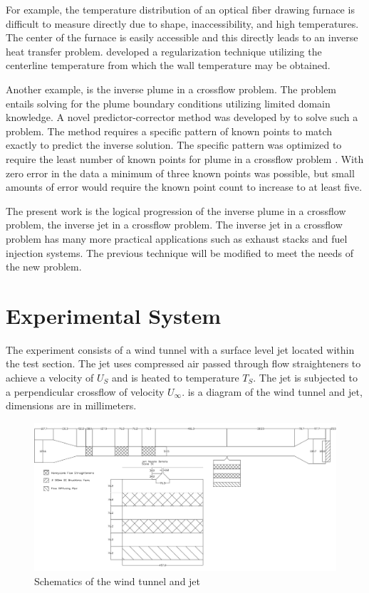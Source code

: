 \documentclass[preprint,12pt]{elsarticle}
\begin{document}
For example, the temperature distribution of an optical fiber drawing furnace is difficult to measure directly due to shape, inaccessibility, and high temperatures.  The center of the furnace is easily accessible and this directly leads to an inverse heat transfer problem.   developed a regularization technique utilizing the centerline temperature from which the wall temperature may be obtained.

Another example, is the inverse plume in a crossflow problem.  The problem entails solving for the plume boundary conditions utilizing limited domain knowledge.  A novel predictor-corrector method was developed by \citet{ijhmt1} to solve such a problem.  The method requires a specific pattern of known points to match exactly to predict the inverse solution.  The specific pattern was optimized to require the least number of known points for plume in a crossflow problem \cite{ijhmt2}.  With zero error in the data a minimum of three known points was possible, but small amounts of error would require the known point count to increase to at least five.

The present work is the logical progression of the inverse plume in a crossflow problem, the inverse jet in a crossflow problem.  The inverse jet in a crossflow problem has many more practical applications such as exhaust stacks and fuel injection systems.  The previous technique will be modified to meet the needs of the new problem.


\section{Experimental System}
The experiment consists of a wind tunnel with a surface level jet located within the test section.  The jet uses compressed air passed through flow straighteners to achieve a velocity of $U_S$ and is heated to temperature $T_S$.  The jet is subjected to a perpendicular crossflow of velocity $U_{\infty}$.   is a diagram of the wind tunnel and jet, dimensions are in millimeters.

\begin{figure}[!tbp]
\begin{center}
\includegraphics[scale=.30]{windtunneljet.jpg}
\caption{Schematics of the wind tunnel and jet}
\label{fig:diagramjet}
\end{center}
\end{figure}
\end{document}
